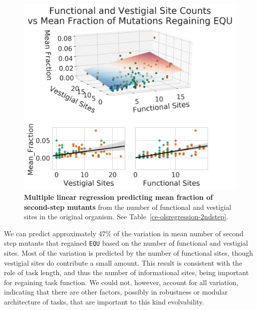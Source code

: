 \documentclass[10pt,letterpaper,final]{article}
\begin{document}
	\begin{figure}[!h] %
	\includegraphics[width=0.95\columnwidth]{figures/CE/CCE_2step_vs_func_vest_sites.png}
	\caption{\textbf{Multiple linear regression predicting mean fraction of second-step mutants} from the number of functional and vestigial sites in the original organism. See Table~\ref{ce-olsregression-2ndstep}.
	}\label{fig:CCE_2step_vs_func_vest_sites}
	\end{figure}

We can predict approximately 47\% of the variation in mean number of second step mutants that regained \texttt{EQU} based on the number of functional and vestigial sites. Most of the variation is predicted by the number of functional sites, though vestigial sites do contribute a small amount. This result is consistent with the role of task length, and thus the number of informational sites, being important for regaining task function. We could not, however, account for all variation, indicating that there are other factors, possibly in robustness or modular architecture of tasks, that are important to this kind evolvability.
\end{document}
